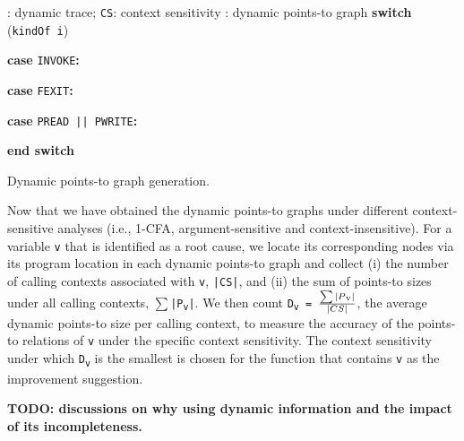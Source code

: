 \newcommand{\SWITCH}[1]{\STATE \textbf{switch} (#1) \begin{ALC@g}}
\newcommand{\ENDSWITCH}{\end{ALC@g} \STATE \textbf{end switch}}
\newcommand{\CASE}[1]{\STATE \textbf{case} #1\textbf{:} \begin{ALC@g}}
\newcommand{\ENDCASE}{\end{ALC@g}}
\newcommand{\CASELINE}[1]{\STATE \textbf{case} #1\textbf{:} \begin{ALC@g}}
\newcommand{\DEFAULT}{\STATE \textbf{default:} \begin{ALC@g}}
\newcommand{\ENDDEFAULT}{\end{ALC@g}}
\newcommand{\DEFAULTLINE}[1]{\STATE \textbf{default:} }

\begin{algorithm}[th!]
\begin{algorithmic}[1]
{
\renewcommand{\algorithmicrequire}{\textbf{Input:}}
\renewcommand{\algorithmicensure}{\textbf{Output:}}
: dynamic trace; {\tt CS}: context sensitivity
: dynamic points-to graph
\SWITCH {{\tt kindOf i}}
\CASE {{\tt INVOKE}}
 \ENDCASE
\CASELINE {{\tt FEXIT}}
 \ENDCASE
  \CASELINE {{\tt PREAD || PWRITE}}
\ENDIF
{}
 \ENDCASE
\ENDSWITCH
\ENDWHILE
}
\end{algorithmic}
\caption{Dynamic points-to graph generation.}
\label{alg:dyn-pts}
\end{algorithm}

Now that we have obtained the dynamic points-to graphs under different context-sensitive analyses (i.e., 1-CFA, argument-sensitive and context-insensitive). For a variable {\tt v} that is identified as a root cause, we locate its corresponding nodes via its program location in each dynamic points-to graph and collect (i) the number of calling contexts associated with {\tt v}, {\tt |CS|}, and (ii) the sum of points-to sizes under all calling contexts, {\tt $\sum$|P\textsubscript{v}|}. We then count {\tt D\textsubscript{v} = $\sum|P\textsubscript{v}|\over |CS|$}, the average dynamic points-to size per calling context, to measure the accuracy of the points-to relations of {\tt v} under the specific context sensitivity. The context sensitivity under which {\tt D\textsubscript{v}} is the smallest is chosen for the function that contains {\tt v} as the improvement suggestion.

{\bf TODO: discussions on why using dynamic information and the impact of its incompleteness.} 